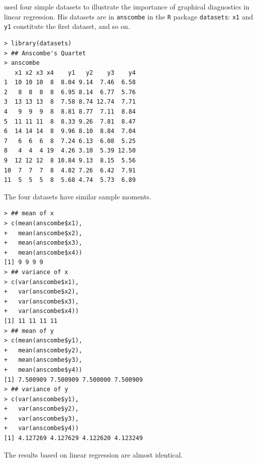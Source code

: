 \citet{anscombe1973graphs} used four simple datasets to illustrate the importance of graphical diagnostics in linear regression. 
His datasets are in \texttt{anscombe} in the \texttt{R} package \texttt{datasets}: \texttt{x1} and \texttt{y1} constitute the first dataset, and so on. 



\begin{lstlisting}
> library(datasets)
> ## Anscombe's Quartet
> anscombe
   x1 x2 x3 x4    y1   y2    y3    y4
1  10 10 10  8  8.04 9.14  7.46  6.58
2   8  8  8  8  6.95 8.14  6.77  5.76
3  13 13 13  8  7.58 8.74 12.74  7.71
4   9  9  9  8  8.81 8.77  7.11  8.84
5  11 11 11  8  8.33 9.26  7.81  8.47
6  14 14 14  8  9.96 8.10  8.84  7.04
7   6  6  6  8  7.24 6.13  6.08  5.25
8   4  4  4 19  4.26 3.10  5.39 12.50
9  12 12 12  8 10.84 9.13  8.15  5.56
10  7  7  7  8  4.82 7.26  6.42  7.91
11  5  5  5  8  5.68 4.74  5.73  6.89
\end{lstlisting}


The four datasets have similar sample moments. 

\begin{lstlisting}
> ## mean of x
> c(mean(anscombe$x1),
+   mean(anscombe$x2),
+   mean(anscombe$x3),
+   mean(anscombe$x4))
[1] 9 9 9 9
> ## variance of x
> c(var(anscombe$x1),
+   var(anscombe$x2),
+   var(anscombe$x3),
+   var(anscombe$x4))
[1] 11 11 11 11
> ## mean of y
> c(mean(anscombe$y1),
+   mean(anscombe$y2),
+   mean(anscombe$y3),
+   mean(anscombe$y4))
[1] 7.500909 7.500909 7.500000 7.500909
> ## variance of y
> c(var(anscombe$y1),
+   var(anscombe$y2),
+   var(anscombe$y3),
+   var(anscombe$y4))
[1] 4.127269 4.127629 4.122620 4.123249
\end{lstlisting}

The results based on linear regression are almost identical. 

